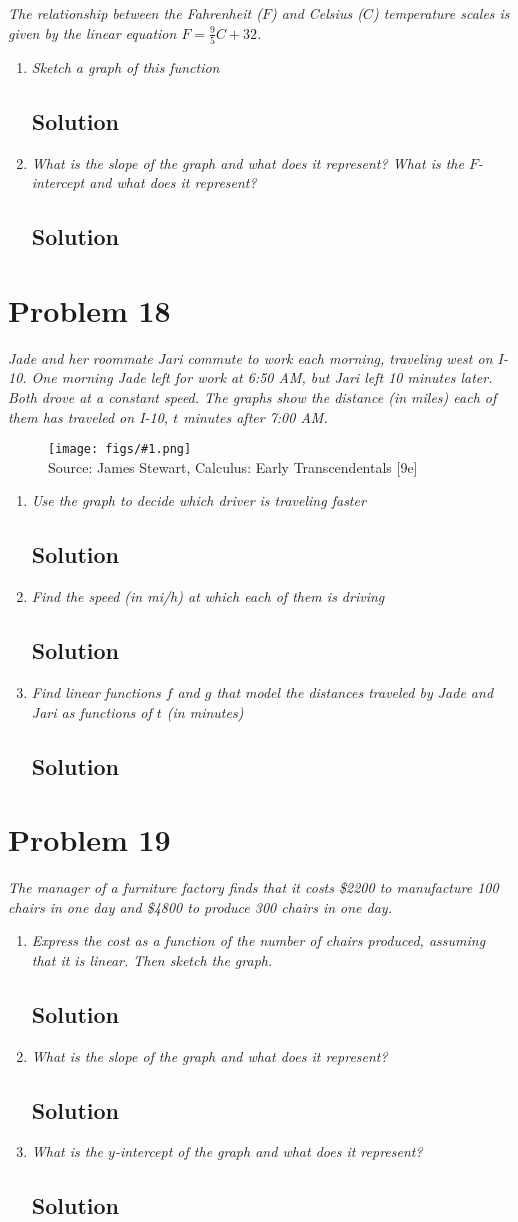 \documentclass[11pt]{article}
\newcommand{\soln}{\subsection*}
\newcommand{\qn}{\textit}
\newcommand{\imagesource}[1]{{\footnotesize Source: #1}}
\newcommand{\imgqn}[1]{
	\begin{figure}[H]
		\centering
		\texttt{[image: figs/\#1.png]}\\
		\imagesource{James Stewart, Calculus: Early Transcendentals [9e]}
	\end{figure}
}
\begin{document}
\qn{The relationship between the Fahrenheit ($F$) and Celsius ($C$) temperature scales is given by the linear equation $F=\frac{9}{5}C+32$.}

\begin{enumerate}
	\item \qn{Sketch a graph of this function}
	\soln{Solution}
	
	\item \qn{What is the slope of the graph and what does it represent? What is the $F$-intercept and what does it represent?}
	\soln{Solution}
\end{enumerate}

\section*{Problem 18}

\qn{Jade and her roommate Jari commute to work each morning, traveling west on I-10. One morning Jade left for work at 6:50 AM, but Jari left 10 minutes later. Both drove at a constant speed. The graphs show the distance (in miles) each of them has traveled on I-10, $t$ minutes after 7:00 AM.}

\imgqn{1.2.18}

\begin{enumerate}
	\item \qn{Use the graph to decide which driver is traveling faster}
	\soln{Solution}
	
	\item \qn{Find the speed (in mi/h) at which each of them is driving}
	\soln{Solution}
	
	\item \qn{Find linear functions $f$ and $g$ that model the distances traveled by Jade and Jari as functions of $t$ (in minutes)}
	\soln{Solution}
\end{enumerate}

\section*{Problem 19}

\qn{The manager of a furniture factory finds that it costs \$2200 to manufacture 100 chairs in one day and \$4800 to produce 300 chairs in one day.}

\begin{enumerate}
	\item \qn{Express the cost as a function of the number of chairs produced, assuming that it is linear. Then sketch the graph.}
	\soln{Solution}
	
	\item \qn{What is the slope of the graph and what does it represent?}
	\soln{Solution}
	
	\item \qn{What is the $y$-intercept of the graph and what does it represent?}
	\soln{Solution}
\end{enumerate}
\end{document}
